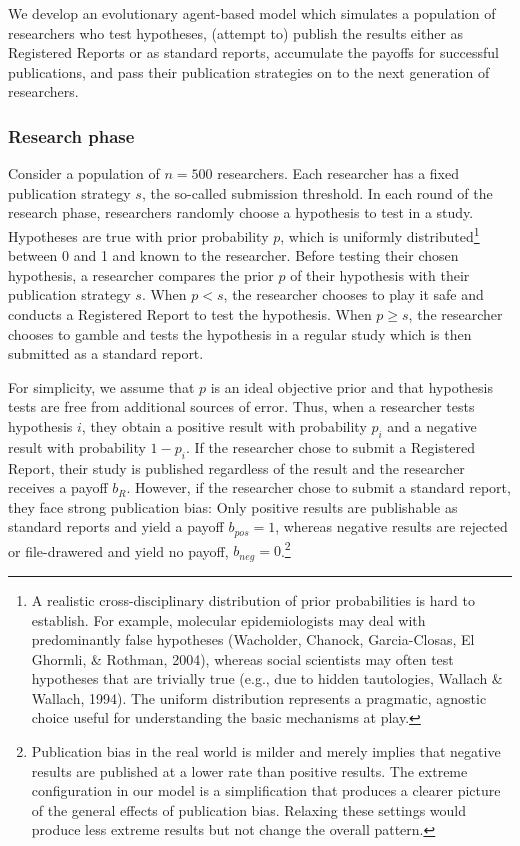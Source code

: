 \documentclass[
  british,
  a4paper,
  ,man,floatsintext]{apa6}
\begin{document}
We develop an evolutionary agent-based model which simulates a population of researchers who test hypotheses, (attempt to) publish the results either as Registered Reports or as standard reports, accumulate the payoffs for successful publications, and pass their publication strategies on to the next generation of researchers.

\subsubsection{Research phase}\label{research-phase}

Consider a population of \(n = 500\) researchers.
Each researcher has a fixed publication strategy \(s\), the so-called submission threshold.
In each round of the research phase, researchers randomly choose a hypothesis to test in a study.
Hypotheses are true with prior probability \(p\), which is uniformly distributed\footnote{A realistic cross-disciplinary distribution of prior probabilities is hard to establish. For example, molecular epidemiologists may deal with predominantly false hypotheses (Wacholder, Chanock, Garcia-Closas, El Ghormli, \& Rothman, 2004), whereas social scientists may often test hypotheses that are trivially true (e.g., due to hidden tautologies, Wallach \& Wallach, 1994). The uniform distribution represents a pragmatic, agnostic choice useful for understanding the basic mechanisms at play.} between 0 and 1 and known to the researcher.
Before testing their chosen hypothesis, a researcher compares the prior \(p\) of their hypothesis with their publication strategy \(s\).
When \(p < s\), the researcher chooses to play it safe and conducts a Registered Report to test the hypothesis.
When \(p \geq s\), the researcher chooses to gamble and tests the hypothesis in a regular study which is then submitted as a standard report.

For simplicity, we assume that \(p\) is an ideal objective prior and that hypothesis tests are free from additional sources of error.
Thus, when a researcher tests hypothesis \(i\), they obtain a positive result with probability \(p_i\) and a negative result with probability \(1-p_i\).
If the researcher chose to submit a Registered Report, their study is published regardless of the result and the researcher receives a payoff \(b_{R}\).
However, if the researcher chose to submit a standard report, they face strong publication bias:
Only positive results are publishable as standard reports and yield a payoff \(b_{pos} = 1\), whereas negative results are rejected or file-drawered and yield no payoff, \(b_{neg} = 0\).\footnote{Publication bias in the real world is milder and merely implies that negative results are published at a lower rate than positive results. The extreme configuration in our model is a simplification that produces a clearer picture of the general effects of publication bias. Relaxing these settings would produce less extreme results but not change the overall pattern.}
\end{document}
